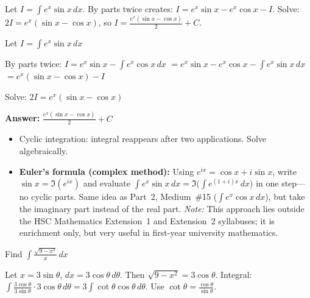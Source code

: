 \begin{hint}
Let $I = \int e^x \sin x \, dx$. By parts twice creates: $I = e^x\sin x - e^x\cos x - I$. Solve: $2I = e^x(\sin x - \cos x)$, so $I = \frac{e^x(\sin x - \cos x)}{2} + C$.
\end{hint}

\begin{solution}
Let $I = \int e^x\sin x\,dx$

By parts twice:
$I = e^x\sin x - \int e^x\cos x\,dx$
$= e^x\sin x - e^x\cos x - \int e^x\sin x\,dx$
$= e^x(\sin x - \cos x) - I$

Solve: $2I = e^x(\sin x - \cos x)$

\textbf{Answer:} $\boxed{\frac{e^x(\sin x - \cos x)}{2} + C}$
\end{solution}

\begin{takeaways}
\begin{itemize}
\item Cyclic integration: integral reappears after two applications. Solve algebraically.
\item \textbf{Euler's formula (complex method):} Using $e^{ix}=\cos x+i\sin x$, write $\sin x=\Im(e^{ix})$ and evaluate $\int e^x\sin x\,dx=\Im\!\big(\int e^{(1+i)x}\,dx\big)$ in one step---no cyclic parts. Same idea as Part~2, Medium~\#15 ($\int e^x\cos x\,dx$), but take the imaginary part instead of the real part. \textit{Note:} This approach lies outside the HSC Mathematics Extension~1 and Extension~2 syllabuses; it is enrichment only, but very useful in first-year university mathematics.
\end{itemize}
\end{takeaways}

\vspace{1cm}

\begin{problem}
Find $\displaystyle \int \frac{\sqrt{9 - x^2}}{x} \, dx$
\end{problem}

\begin{hint}
Let $x = 3\sin\theta$, $dx = 3\cos\theta \, d\theta$. Then $\sqrt{9-x^2} = 3\cos\theta$. Integral: $\int \frac{3\cos\theta}{3\sin\theta} \cdot 3\cos\theta \, d\theta = 3\int\cot\theta\cos\theta \, d\theta$. Use $\cot\theta = \frac{\cos\theta}{\sin\theta}$.
\end{hint}

